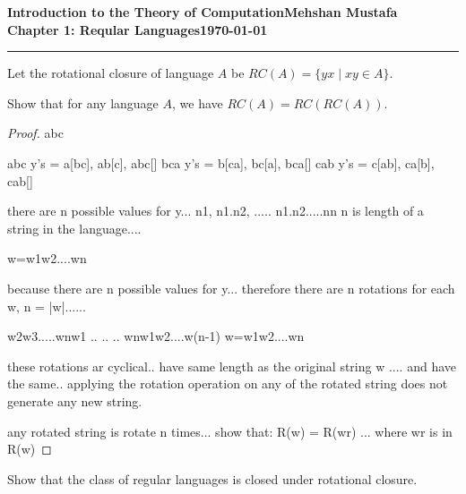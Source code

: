 \documentclass[11pt]{article}
\newcommand{\myname}{Mehshan Mustafa}
\newcommand{\dated}{\today}
\newenvironment{problem}[2][Problem]{\begin{trivlist}
\item[\hskip \labelsep {\bfseries #1}\hskip \labelsep {\bfseries #2.}]}{\end{trivlist}}
\begin{document}
\textbf{Introduction to the Theory of
Computation}\hfill\textbf{\myname}\\[0.01in]
\textbf{Chapter 1: Reqular Languages}\hfill\textbf{\dated}\\
\smallskip\hrule\bigskip

\begin{problem}{1.67}
Let the rotational closure of language $A$ be $RC(A) = \{yx \; | \; xy \in A\}$.
\end{problem}

\begin{problem}[Part]{a}
Show that for any language $A$, we have $RC(A) = RC(RC(A))$.
\end{problem}

\begin{proof}
abc

abc     y's = a[bc], ab[c], abc[]
bca	y's = b[ca], bc[a], bca[]
cab	y's = c[ab], ca[b], cab[]


there are n possible values for y... n1, n1.n2, ..... n1.n2.....nn    n is length of a string in the language....

w=w1w2....wn

because there are n possible values for y... therefore there are n rotations for each w, n = |w|......

w2w3.....wnw1
..
..
..
wnw1w2....w(n-1)
w=w1w2....wn

these rotations ar cyclical.. have same length as the original string w .... and have the same.. applying the rotation operation on any of the rotated string does not generate any new string.

any rotated string is rotate n times...  show that:
R(w) = R(wr) ... where wr is in R(w)

\end{proof}

\begin{problem}[Part]{b}
Show that the class of regular languages is closed under rotational closure.
\end{problem}
\end{document}
